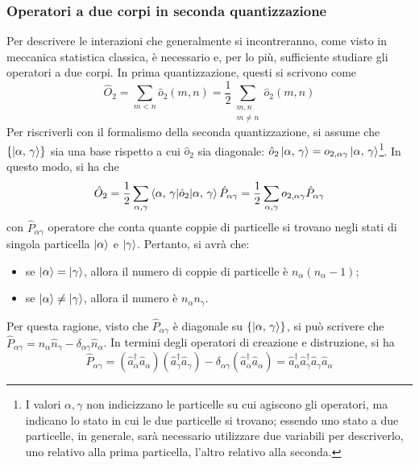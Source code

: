 \documentclass[11pt, a4paper]{scrartcl}
\theoremstyle{style}
\theoremstyle{style1}
\numberwithin{equation}{subsection}
\begin{document}
\subsubsection{Operatori a due corpi in seconda quantizzazione}
Per descrivere le interazioni che generalmente si incontreranno, come visto in meccanica statistica classica, \`e necessario e, per lo pi\`u, sufficiente studiare gli operatori a due corpi.
In prima quantizzazione, questi si scrivono come
\[
	\hat{O}_2 = \sum_{m<n}^{} \hat{o}_2 (m,n) = \frac{1}{2} \sum_{\substack{m,n\\ m\neq n}}^{} \hat{o}_2(m,n)
\] 
Per riscriverli con il formalismo della seconda quantizzazione, si assume che $\left\{ \ket{\alpha ,\,\gamma}  \right\} $ sia una base rispetto a cui $\hat{o}_2$ sia diagonale: $\hat{o}_2 \ket{\alpha ,\, \gamma} = o_{2, \alpha \gamma} \ket{\alpha ,\, \gamma} $\footnote{I valori $\alpha , \gamma$ non indicizzano le particelle su cui agiscono gli operatori, ma indicano lo stato in cui le due particelle si trovano; essendo uno stato a due particelle, in generale, sar\`a necessario utilizzare due variabili per descriverlo, uno relativo alla prima particella, l'altro relativo alla seconda.}. 
In questo modo, si ha che
\[
\hat{O}_2 =\frac{1}{2}\sum_{\alpha ,\gamma}^{} \braket{\alpha ,\, \gamma|\hat{o}_2|\alpha ,\, \gamma}   \hat{P}_{\alpha \gamma} =\frac{1}{2}\sum_{\alpha ,\gamma}^{} o_{2,\alpha \gamma}  \hat{P}_{\alpha \gamma} 
\] 
con $\hat{P}_{\alpha \gamma} $ operatore che conta quante coppie di particelle si trovano negli stati di singola particella $\ket{\alpha } $ e $\ket{\gamma} $.
Pertanto, si avr\`a che:
\begin{itemize}
	\item se $\ket{\alpha } =\ket{\gamma} $, allora il numero di coppie di particelle \`e $n_\alpha (n_\alpha -1)$;
	\item se $\ket{\alpha } \neq \ket{\gamma} $, allora il numero \`e $n_\alpha n_\gamma$.
\end{itemize}
Per questa ragione, visto che $\hat{P}_{\alpha \gamma} $ \`e diagonale su $\left\{ \ket{\alpha ,\, \gamma}  \right\} $, si pu\`o scrivere che $\hat{P}_{\alpha \gamma}  = \hat{n}_\alpha \hat{n}_{\gamma}  - \delta _{\alpha \gamma} \hat{n}_\alpha $.
In termini degli operatori di creazione e distruzione, si ha
\[
\hat{P}_{\alpha \gamma}  = \left(\hat{a}^\dagger _\alpha \hat{a}_\alpha \right) \left(\hat{a}^\dagger _\gamma \hat{a}_\gamma\right) - \delta _{\alpha \gamma} \left(\hat{a}^\dagger _\alpha \hat{a}_\alpha \right) = \hat{a}^\dagger _\alpha \hat{a}^\dagger _\gamma \hat{a} _\gamma \hat{a}_\alpha 
\] 
\end{document}
